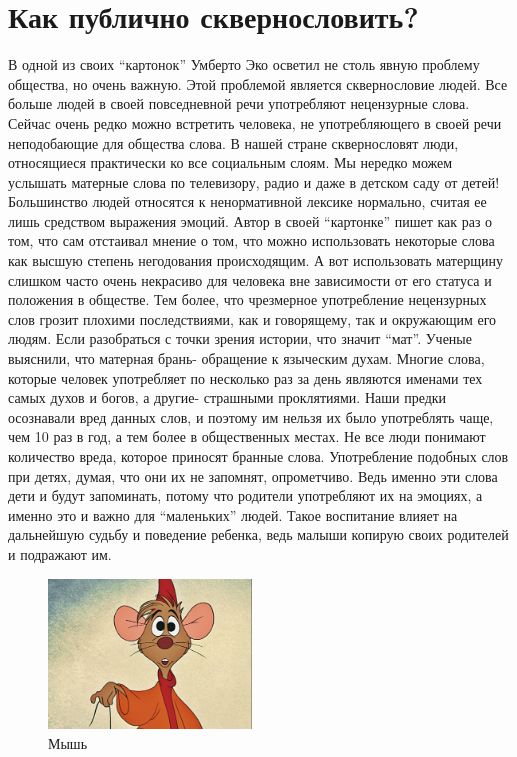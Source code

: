 \documentclass{report}
\begin{document}
\section{Как публично сквернословить?}

В одной из своих “картонок” Умберто Эко осветил не столь явную проблему общества, но очень важную. Этой проблемой является сквернословие людей. Все больше людей в своей повседневной речи употребляют нецензурные слова. Сейчас очень редко можно встретить человека, не употребляющего в своей речи неподобающие для общества слова. В нашей стране сквернословят люди, относящиеся практически ко все социальным слоям. Мы нередко можем услышать матерные слова по телевизору, радио и даже в детском саду от детей! Большинство людей относятся к ненормативной лексике нормально, считая ее лишь средством выражения эмоций. Автор в своей “картонке” пишет как раз о том, что сам отстаивал мнение о том, что можно использовать некоторые слова как высшую степень негодования происходящим. А вот использовать матерщину слишком часто очень некрасиво для человека вне зависимости от его статуса и положения в обществе. Тем более, что чрезмерное употребление нецензурных слов грозит плохими последствиями, как и говорящему, так и окружающим его людям. Если разобраться с точки зрения истории, что значит “мат”. Ученые выяснили, что матерная брань- обращение к языческим духам. Многие слова, которые человек употребляет по несколько раз за день являются именами тех самых духов и богов, а другие- страшными проклятиями. Наши предки осознавали вред данных слов, и поэтому им нельзя их было употреблять чаще, чем 10 раз в год, а тем более в общественных местах. Не все люди понимают количество вреда, которое приносят бранные слова. Употребление подобных слов при детях, думая, что они их не запомнят, опрометчиво.  Ведь именно эти слова дети и будут запоминать, потому что родители употребляют их на эмоциях, а именно это и важно для “маленьких” людей. Такое воспитание влияет на дальнейшую судьбу и поведение ребенка, ведь малыши копирую своих родителей и подражают им. 


\begin{figure}
  \vspace{-20pt}
  \begin{center}
    \includegraphics[width=0.48\textwidth]{mouse.jpeg}
  \end{center}
  \vspace{-20pt}
  \caption{Мышь} 
  \vspace{-10pt}
\end{figure}
\end{document}
